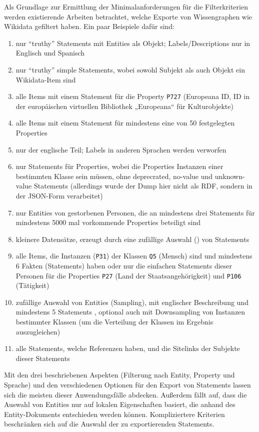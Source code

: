 Als Grundlage zur Ermittlung der Minimalanforderungen für die Filterkriterien werden existierende Arbeiten betrachtet, welche Exporte von Wissengraphen wie Wikidata gefiltert haben.
Ein paar Beispiele dafür sind:
\begin{enumerate}[label=\arabic*)]
  \item nur "`truthy"' Statements mit Entities als Objekt; Labels/Descriptions nur in Englisch und Spanisch \cite{usage-grafa}
  \item nur "`truthy"' simple Statements, wobei sowohl Subjekt als auch Objekt ein Wikidata-Item sind \cite{usage-wembedder}
  \item alle Items mit einem Statement für die Property \verb|P727| (Europeana ID, ID in der europäischen virtuellen Bibliothek „Europeana“ für Kulturobjekte) \cite{usage-europeana}
  \item alle Items mit einem Statement für mindestens eine von 50 festgelegten Properties \cite{usage-narratives} 
  \item nur der englische Teil; Labels in anderen Sprachen werden verworfen \cite{usage-web-tables} 
  \item nur Statements für Properties, wobei die Properties Instanzen einer bestimmten Klasse sein müssen, ohne deprecrated, no-value und unknown-value Statements \cite{usage-implicational-knowledge} (allerdings wurde der Dump hier nicht als RDF, sondern in der JSON-Form verarbeitet)
  \item nur Entities von gestorbenen Personen, die an mindestens drei Statements für mindestens 5000 mal vorkommende Properties beteiligt sind \cite{usage-learning-structured-embeddings}
  \item kleinere Datensätze, erzeugt durch eine zufällige Auswahl () von Statements \cite{usage-sparql-benchmark}
  \item alle Items, die Instanzen (\verb|P31|) der Klassen \verb|Q5| (Mensch) sind und mindestens 6 Fakten (Statements) haben\cite{usage-one-sentence} oder nur die einfachen Statements dieser Personen für die Properties \verb|P27| (Land der Staatsangehörigkeit) und \verb|P106| (Tätigkeit) \cite{usage-person-networks}
  \item zufällige Auswahl von Entities (Sampling), mit englischer Beschreibung und mindestens 5 Statements \cite{usage-generate-entity-type-desc}, optional auch mit Downsampling von Instanzen bestimmter Klassen (um die Verteilung der Klassen im Ergebnis auszugleichen) \cite{usage-synthesize-entity-desc}
  \item alle Statements, welche Referenzen haben, und die Sitelinks der Subjekte dieser Statements \cite{wd-wk-common-references}
\end{enumerate}
Mit den drei beschriebenen Aspekten (Filterung nach Entity, Property und Sprache) und den verschiedenen Optionen für den Export von Statements lassen sich die meisten dieser Anwendungsfälle abdecken.
Außerdem fällt auf, dass die Auswahl von Entities nur auf lokalen Eigenschaften basiert, die anhand des Entity-Dokuments entschieden werden können. 
Kompliziertere Kriterien beschränken sich auf die Auswahl der zu exportierenden Statements.

